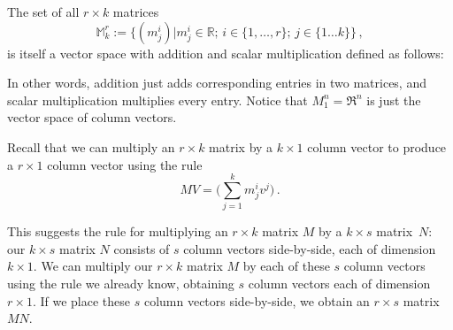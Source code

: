 The set of all $r\times k$ matrices 
$${\mathbb M}_k^r:=\{(m^i_j)|m^i_j\in {\mathbb R};\,  
i\in \{1,\dots,r\} ;\, 
j\in \{1\dots k\} \}\, ,$$ 
is itself  a vector space with  addition and scalar multiplication defined as follows:


In other words, addition just adds corresponding entries in two matrices, and scalar multiplication multiplies every entry.
Notice that $M_1^n = \Re^n$ is just the vector space of column vectors.

Recall that we can multiply an \(r \times k\) matrix by a \(k \times 1\) column vector to produce a \(r \times 1\) column vector using the rule
\[MV = \big(\sum_{j=1}^k m_j^i v^j\big)\, .\]

This suggests the rule for multiplying an \(r \times k\) matrix \(M\) by a \(k \times s\) matrix~\(N\): our \(k \times s\) matrix \(N\) consists of \(s\) column vectors side-by-side, each of dimension \(k \times 1.\) We can multiply our \(r \times k\) matrix \(M\) by each of these \(s\) column vectors using the rule we already know, obtaining \(s\) column vectors each of dimension \(r \times 1.\) If we place these \(s\) column vectors side-by-side, we obtain an \(r \times s\) matrix \(MN.\)

